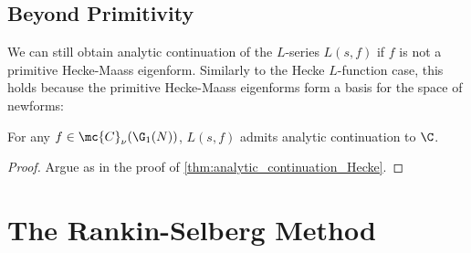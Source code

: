     \subsection*{Beyond Primitivity}
      We can still obtain analytic continuation of the $L$-series $L(s,f)$ if $f$ is not a primitive Hecke-Maass eigenform. Similarly to the Hecke $L$-function case, this holds because the primitive Hecke-Maass eigenforms form a basis for the space of newforms:

      \begin{theorem}\label{thm:analytic_continuation_Hecke-Maass}
        For any $f \in \mc{C}_{\nu}(\G_{1}(N))$, $L(s,f)$ admits analytic continuation to $\C$.
      \end{theorem}
      \begin{proof}
        Argue as in the proof of \cref{thm:analytic_continuation_Hecke}.
      \end{proof}
  \section{The Rankin-Selberg Method}
